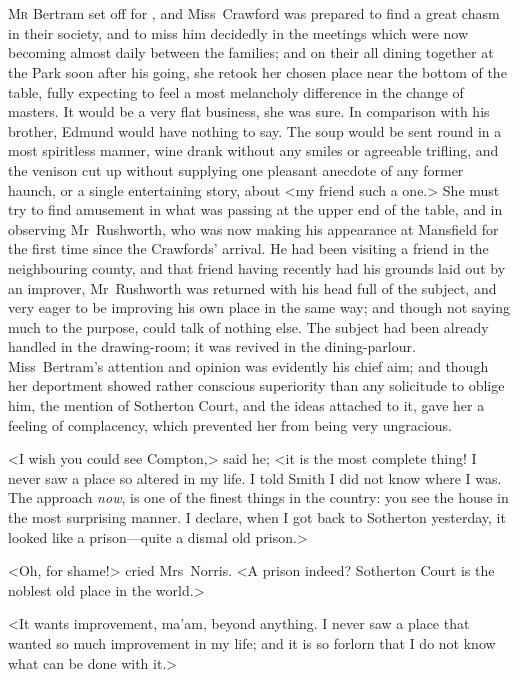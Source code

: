 \chapter[Chapter \thechapter]{} 

 \lettrine[lraise=0.3]{M}{r} Bertram set off for \doubleemdash, and Miss~Crawford was prepared to find a great chasm in their society, and to miss him decidedly in the meetings which were now becoming almost daily between the families; and on their all dining together at the Park soon after his going, she retook her chosen place near the bottom of the table, fully expecting to feel a most melancholy difference in the change of masters. It would be a very flat business, she was sure. In comparison with his brother, Edmund would have nothing to say. The soup would be sent round in a most spiritless manner, wine drank without any smiles or agreeable trifling, and the venison cut up without supplying one pleasant anecdote of any former haunch, or a single entertaining story, about <my friend such a one.> She must try to find amusement in what was passing at the upper end of the table, and in observing Mr~Rushworth, who was now making his appearance at Mansfield for the first time since the Crawfords' arrival. He had been visiting a friend in the neighbouring county, and that friend having recently had his grounds laid out by an improver, Mr~Rushworth was returned with his head full of the subject, and very eager to be improving his own place in the same way; and though not saying much to the purpose, could talk of nothing else. The subject had been already handled in the drawing-room; it was revived in the dining-parlour. Miss~Bertram's attention and opinion was evidently his chief aim; and though her deportment showed rather conscious superiority than any solicitude to oblige him, the mention of Sotherton Court, and the ideas attached to it, gave her a feeling of complacency, which prevented her from being very ungracious.

<I wish you could see Compton,> said he; <it is the most complete thing! I never saw a place so altered in my life. I told Smith I did not know where I was. The approach \textit{now}, is one of the finest things in the country: you see the house in the most surprising manner. I declare, when I got back to Sotherton yesterday, it looked like a prison—quite a dismal old prison.>

<Oh, for shame!> cried Mrs~Norris. <A prison indeed? Sotherton Court is the noblest old place in the world.>

<It wants improvement, ma'am, beyond anything. I never saw a place that wanted so much improvement in my life; and it is so forlorn that I do not know what can be done with it.>

